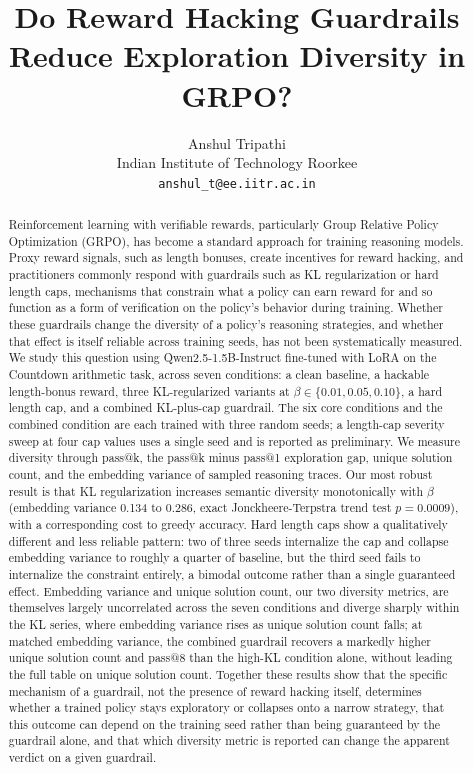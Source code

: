 \documentclass{article}
\title{Do Reward Hacking Guardrails Reduce Exploration Diversity in GRPO?}
\author{Anshul Tripathi \\
  Indian Institute of Technology Roorkee \\
  \texttt{anshul\_t@ee.iitr.ac.in} \\
}
\begin{document}
\maketitle

\begin{abstract}
Reinforcement learning with verifiable rewards, particularly Group Relative Policy Optimization (GRPO), has become a standard approach for training reasoning models. Proxy reward signals, such as length bonuses, create incentives for reward hacking, and practitioners commonly respond with guardrails such as KL regularization or hard length caps, mechanisms that constrain what a policy can earn reward for and so function as a form of verification on the policy's behavior during training. Whether these guardrails change the diversity of a policy's reasoning strategies, and whether that effect is itself reliable across training seeds, has not been systematically measured. We study this question using Qwen2.5-1.5B-Instruct fine-tuned with LoRA on the Countdown arithmetic task, across seven conditions: a clean baseline, a hackable length-bonus reward, three KL-regularized variants at $\beta \in \{0.01, 0.05, 0.10\}$, a hard length cap, and a combined KL-plus-cap guardrail. The six core conditions and the combined condition are each trained with three random seeds; a length-cap severity sweep at four cap values uses a single seed and is reported as preliminary. We measure diversity through pass@k, the pass@k minus pass@1 exploration gap, unique solution count, and the embedding variance of sampled reasoning traces. Our most robust result is that KL regularization increases semantic diversity monotonically with $\beta$ (embedding variance 0.134 to 0.286, exact Jonckheere-Terpstra trend test $p=0.0009$), with a corresponding cost to greedy accuracy. Hard length caps show a qualitatively different and less reliable pattern: two of three seeds internalize the cap and collapse embedding variance to roughly a quarter of baseline, but the third seed fails to internalize the constraint entirely, a bimodal outcome rather than a single guaranteed effect. Embedding variance and unique solution count, our two diversity metrics, are themselves largely uncorrelated across the seven conditions and diverge sharply within the KL series, where embedding variance rises as unique solution count falls; at matched embedding variance, the combined guardrail recovers a markedly higher unique solution count and pass@8 than the high-KL condition alone, without leading the full table on unique solution count. Together these results show that the specific mechanism of a guardrail, not the presence of reward hacking itself, determines whether a trained policy stays exploratory or collapses onto a narrow strategy, that this outcome can depend on the training seed rather than being guaranteed by the guardrail alone, and that which diversity metric is reported can change the apparent verdict on a given guardrail.
\end{abstract}
\end{document}

